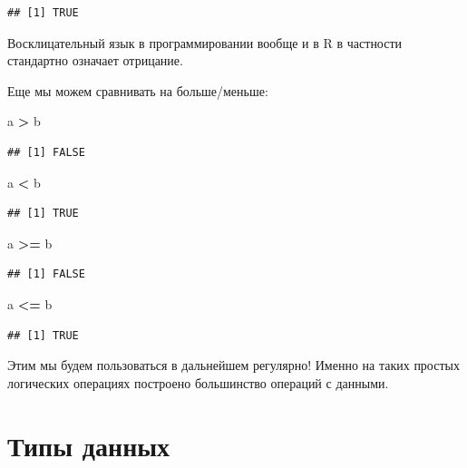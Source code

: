 \documentclass[
]{book}
\newenvironment{Shaded}{\begin{snugshade}}{\end{snugshade}}
\newcommand{\NormalTok}[1]{#1}
\newcommand{\OperatorTok}[1]{\textcolor[rgb]{0.81,0.36,0.00}{\textbf{#1}}}
\newcommand{\StringTok}[1]{\textcolor[rgb]{0.31,0.60,0.02}{#1}}
\begin{document}
\begin{verbatim}
## [1] TRUE
\end{verbatim}

Восклицательный язык в программировании вообще и в R в частности стандартно означает отрицание.

Еще мы можем сравнивать на больше/меньше:

\begin{Shaded}
\begin{Highlighting}[]
\NormalTok{a }\OperatorTok{>}\StringTok{ }\NormalTok{b}
\end{Highlighting}
\end{Shaded}

\begin{verbatim}
## [1] FALSE
\end{verbatim}

\begin{Shaded}
\begin{Highlighting}[]
\NormalTok{a }\OperatorTok{<}\StringTok{ }\NormalTok{b}
\end{Highlighting}
\end{Shaded}

\begin{verbatim}
## [1] TRUE
\end{verbatim}

\begin{Shaded}
\begin{Highlighting}[]
\NormalTok{a }\OperatorTok{>=}\StringTok{ }\NormalTok{b}
\end{Highlighting}
\end{Shaded}

\begin{verbatim}
## [1] FALSE
\end{verbatim}

\begin{Shaded}
\begin{Highlighting}[]
\NormalTok{a }\OperatorTok{<=}\StringTok{ }\NormalTok{b}
\end{Highlighting}
\end{Shaded}

\begin{verbatim}
## [1] TRUE
\end{verbatim}

Этим мы будем пользоваться в дальнейшем регулярно! Именно на таких простых логических операциях построено большинство операций с данными.

\hypertarget{data_types}{%
\section{Типы данных}\label{data_types}}
\end{document}
